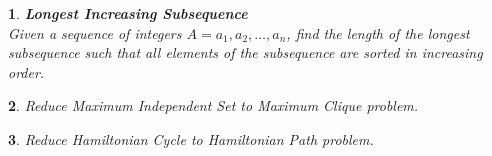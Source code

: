 \documentclass[%
addpoints]{exam}
\theoremstyle{problem}
\newtheorem{p}{}
\begin{document}
\begin{p}
\textbf{Longest Increasing Subsequence}\\[1ex]
Given a sequence of integers $A = a_1, a_2, \ldots, a_n$, find the length of the longest subsequence such that all elements of the subsequence are sorted in increasing order.
\hfill \end{p}

\begin{p}
Reduce Maximum Independent Set to Maximum Clique problem.
\hfill \end{p}

\begin{p}
Reduce Hamiltonian Cycle to Hamiltonian Path problem.
\hfill \end{p}
\end{document}

